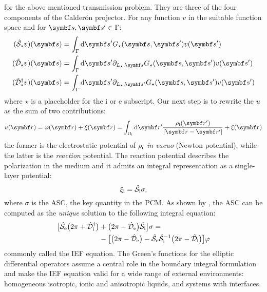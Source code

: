  for the
above mentioned transmission problem.
They are three of the four components of the Calder\'on projector.
For any function $v$ in the suitable function space and for $\vect{s}, \vect{s}^\prime \in \Gamma$:
\begin{subequations}
\begin{align}
  (\bi{S}_\star v)(\vect{s}) &= \int_\Gamma\diff\vect{s}^\prime
  G_\star(\vect{s}, \vect{s}^\prime)v(\vect{s}^\prime)
  \label{eq:S} \\
  (\bi{D}_\star v)(\vect{s}) &= \int_\Gamma\diff\vect{s}^\prime  \partial_{L_\star,\vect{s}}
  G_\star(\vect{s}, \vect{s}^\prime)v(\vect{s}^\prime)
  \label{eq:D} \\
  (\bi{D}^\dagger_\star v)(\vect{s}) &= \int_\Gamma\diff\vect{s}^\prime
\partial_{L_\star,\vect{s}^\prime}
  G_\star(\vect{s}, \vect{s}^\prime)v(\vect{s}^\prime)
  \label{eq:D-dagger}
\end{align}
\end{subequations}
where $\star$ is a placeholder for the $\mathrm{i}$ or $\mathrm{e}$ subscript.
Our next step is to rewrite the $u$ as the sum of two contributions:
\begin{equation}
  u(\vect{r}) = \esp(\vect{r}) + \xi(\vect{r}) = \int_{\Omegai}
  \diff\vect{r}^\prime
  \frac{\rhoi(\vect{r}^\prime)}{|\vect{r}-\vect{r}^\prime|}
  + \xi(\vect{r})
\end{equation}
the former is the electrostatic potential of $\rho_\mathrm{i}$ \emph{in vacuo}
(Newton potential), while the latter is the \emph{reaction} potential.
The reaction potential describes the polarization in the medium
and it admits an integral representation as a single-layer
potential:
\begin{equation}
  \xi_\mathrm{i} = \hat{\mathcal{S}}_\mathrm{i}\sigma,
\end{equation}
where $\sigma$ is the \gls{ASC}, the key quantity in the \acrshort{PCM}.
As shown by \citeauthor{Cances1998-og}, the \acrshort{ASC} can be computed
as the \emph{unique} solution to the following integral equation:
\begin{equation}\label{eq:full-IEF}
  \begin{aligned}
  \big[ \hat{\mathcal{S}}_\mathrm{e}\big(2\pi + \hat{\mathcal{D}}^\dagger_\mathrm{i}\big)
  &+
  \big(2\pi - \hat{\mathcal{D}}_\mathrm{e}\big)\hat{\mathcal{S}}_\mathrm{i}
  \big]\sigma = \\
  &-\big[\big(2\pi-\hat{\mathcal{D}}_\mathrm{e}\big)
  -\hat{\mathcal{S}}_\mathrm{e}\hat{\mathcal{S}}_\mathrm{i}^{-1}
  \big(2\pi-\hat{\mathcal{D}}_\mathrm{i}\big)
  \big]\varphi
  \end{aligned}
\end{equation}
commonly called the \gls{IEF} equation.
The Green's functions for the elliptic differential operators
assume a central role in the boundary integral formulation and make the
\acrshort{IEF} equation valid for a wide range of external
environments: homogeneous isotropic, ionic and anisotropic
liquids,\autocite{Cances1998-og}
and systems with interfaces.\autocite{Corni2002-dr, Frediani2004-er,
Delgado2013-kd, DiRemigio2016-nn}

